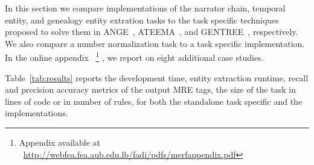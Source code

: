 In this section we compare \framework implementations of 
the narrator chain, temporal entity, and genealogy entity extration 
tasks to the task specific techniques proposed to solve them
in ANGE~\cite{ZaMaFlairs2012HadithBio}, 
ATEEMA~\cite{ZaMa2012IJCLATime},  and
GENTREE~\cite{ZaMaHaCicling2012Entity}, respectively. 
We also compare a \framework number normalization task to 
a task specific implementation. 
In the online appendix%
~\footnote{Appendix available at ~\url{http://webfea.fea.aub.edu.lb/fadi/pdfs/merfappendix.pdf}}%
, we report on eight additional \framework case studies.

Table~\ref{tab:results} reports the development time,
entity extraction runtime, recall and precision accuracy metrics
of the output MRE tags, 
the size of the task in lines of code or in number of \framework rules, 
for both the standalone task specific and the \framework implementations. 

\begin{table}[tb!]
  \centering
\caption{\framework compared to task specific applications.}
  \label{tab:results}%
\end{table}%

